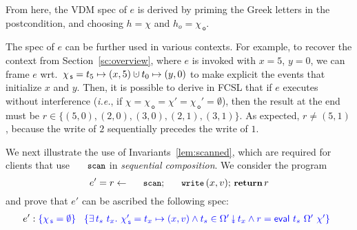 \documentclass[a4paper,UKenglish]{lipics-v2016}
\newcommand{\asgn}{\leftarrow}
\newcommand{\ie}{\emph{i.e.}\xspace}
\newcommand{\dotcup}{\ensuremath{\mathaccent\cdot\cup}}
\newcommand{\esc}[1]{\text{\texttt{\small{#1}}}}
\newcommand{\kw}[1]{\text{\textbf{#1}}}
\newcommand{\selfsub}{\mathsf{s}}
\newcommand{\othersub}{\mathsf{o}}
\newcommand{\hist}{\chi}
\newcommand{\histS}{\hist_{\, \selfsub}}
\newcommand{\histO}{\hist_{\, \othersub}}
\newcommand{\hempty}{\emptyset}
\newcommand{\hunion}{\mathbin{\dotcup}}
\newcommand{\hpts}{\mapsto}
\newcommand{\ldot}{\mathord{.}\,}
\newcommand{\stableorder}{\Omega}
\newcommand{\stableorderP}{\stableorder'}
\newcommand{\histP}{\chi'}
\newcommand{\histSP}{\hist_{\, \selfsub}'}
\newcommand{\histOP}{\hist_{\, \othersub}'}
\newcommand{\tsPre}[1]{\ensuremath{{\textcolor{blue}{#1}}}}
\newcommand{\tsPos}[1]{\ensuremath{\textcolor{blue}{#1}}}
\def\tbnd{\asgn}
\theoremstyle{definition}
\begin{document}
From here, the VDM spec of $e$ is derived by priming the Greek letters
in the postcondition, and choosing $h = \hist$ and $h_o = \histO$.

The spec of $e$ can be further used in various contexts. For example,
to recover the context from Section~\ref{sc:overview}, where $e$ is
invoked with $x = 5$, $y = 0$, we can frame $e$ wrt.~$\histS = t_5
\hpts (x, 5) \hunion t_0 \hpts (y, 0)$ to make explicit the events
that initialize $x$ and $y$. Then, 
%
%
it is possible to derive in FCSL that if $e$ executes without
interference (\ie, if $\hist = \histO = \histP = \histOP = \hempty$),
then the result at the end must be $r \in \{(5,0), (2,0), (3,0),
(2,1), (3,1)\}$. As expected, $r \neq (5, 1)$, because the write of
$2$ sequentially precedes the write of $1$.

We next illustrate the use of Invariants~\ref{lem:scanned}, which are
required for clients that use $\esc{scan}$ in \emph{sequential
  composition}. We consider the program
%
\[
\hfill{
e' = r \tbnd \esc{scan} ;\, \esc{write}\, (x,v);\, {\small{\kw{return}}}\, r 
}\hfill
\]
%
and prove that $e'$ can be ascribed the following spec:
\[
\hfill
e' : \tsPre{\{ \histS = \hempty \}} \
\begin{array}[t]{l}
     \tsPos{\{ \exists\, t_s\ t_x\ldot\,
       \histSP = t_x \hpts (x, v) \wedge
       t_s \in \sideal{\stableorderP}{t_x} \wedge %
           r = \eval\ t_s\ \stableorderP\ \histP \}}
\end{array}\hfill
\]
\end{document}
